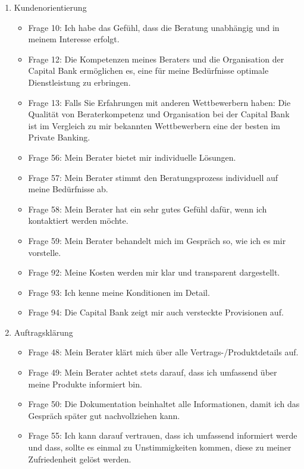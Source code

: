\documentclass{article}\usepackage[]{graphicx}\usepackage[]{color}
\begin{document}
\begin{enumerate}
		
	\item Kundenorientierung
		\begin{itemize}
			\item Frage 10:
			Ich habe das Gefühl, dass die Beratung unabhängig und in meinem Interesse erfolgt.
			\item Frage 12:
			Die Kompetenzen meines Beraters und die Organisation der Capital Bank ermöglichen es, eine für meine Bedürfnisse optimale Dienstleistung zu erbringen.
			\item Frage 13:
			Falls Sie Erfahrungen mit anderen Wettbewerbern haben:
			Die Qualität von Beraterkompetenz und Organisation bei der Capital Bank ist im Vergleich zu mir bekannten Wettbewerbern eine der besten im Private Banking.
			\item Frage 56:
			Mein Berater bietet mir individuelle Lösungen.
			\item Frage 57:
			Mein Berater stimmt den Beratungsprozess individuell auf meine Bedürfnisse ab.
			\item Frage 58:
			Mein Berater hat ein sehr gutes Gefühl dafür, wenn ich kontaktiert werden möchte.
			\item Frage 59:
			Mein Berater behandelt mich im Gespräch so, wie ich es mir vorstelle.
			\item Frage 92:
			Meine Kosten werden mir klar und transparent dargestellt.
			\item Frage 93:
			Ich kenne meine Konditionen im Detail.
			\item Frage 94:
			Die Capital Bank zeigt mir auch versteckte Provisionen auf.
		\end{itemize}
		
		
	\item Auftragsklärung
		\begin{itemize}
			\item Frage 48:
			Mein Berater klärt mich über alle Vertrags-/Produktdetails auf.
			\item Frage 49:
			Mein Berater achtet stets darauf, dass ich umfassend über meine Produkte informiert bin.
			\item Frage 50:
			Die Dokumentation beinhaltet alle Informationen, damit ich das Gespräch später gut nachvollziehen kann.
			\item Frage 55:
			Ich kann darauf vertrauen, dass ich umfassend informiert werde und dass, sollte es einmal zu Unstimmigkeiten kommen, diese zu meiner Zufriedenheit gelöst werden.
		\end{itemize}
		

\end{enumerate}
\end{document}
